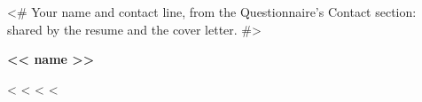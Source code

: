 <# Your name and contact line, from the Questionnaire's Contact section: shared by the resume and the cover letter. #>
\begin{center}
{\LARGE\bfseries << name >>}\par\vspace{2pt}
<%
<%
<%
<%
\end{center}

